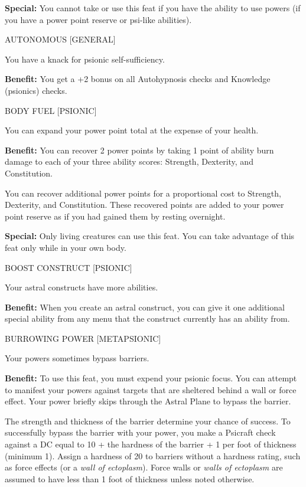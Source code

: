 \documentclass{article}
\begin{document}
\textbf{Special:} You cannot take or use this feat if you have the ability to use 
powers (if you have a power point reserve or psi-like abilities).

\vspace{12pt}
AUTONOMOUS [GENERAL]

You have a knack for psionic self-sufficiency.

\textbf{Benefit:} You get a +2 bonus on all Autohypnosis checks and Knowledge (psionics) 
checks.

\vspace{12pt}
BODY FUEL [PSIONIC]

You can expand your power point total at the expense of your health.

\textbf{Benefit:} You can recover 2 power points by taking 1 point of ability burn 
damage to each of your three ability scores: Strength, Dexterity, and Constitution.

You can recover additional power points for a proportional cost to Strength, Dexterity, 
and Constitution. These recovered points are added to your power point reserve 
as if you had gained them by resting overnight.

\textbf{Special:} Only living creatures can use this feat. You can take advantage 
of this feat only while in your own body.

\vspace{12pt}
BOOST CONSTRUCT [PSIONIC]

Your astral constructs have more abilities.

\textbf{Benefit:} When you create an astral construct, you can give it one additional 
special ability from any menu that the construct currently has an ability from.

\vspace{12pt}
BURROWING POWER [METAPSIONIC]

Your powers sometimes bypass barriers.

\textbf{Benefit:} To use this feat, you must expend your psionic focus. You can 
attempt to manifest your powers against targets that are sheltered behind a wall 
or force effect. Your power briefly skips through the Astral Plane to bypass the 
barrier.

The strength and thickness of the barrier determine your chance of success. To 
successfully bypass the barrier with your power, you make a Psicraft check against 
a DC equal to 10 + the hardness of the barrier + 1 per foot of thickness (minimum 
1). Assign a hardness of 20 to barriers without a hardness rating, such as force 
effects (or a \textit{wall of ectoplasm}). Force walls or \textit{walls of ectoplasm 
}are assumed to have less than 1 foot of thickness unless noted otherwise.
\end{document}
